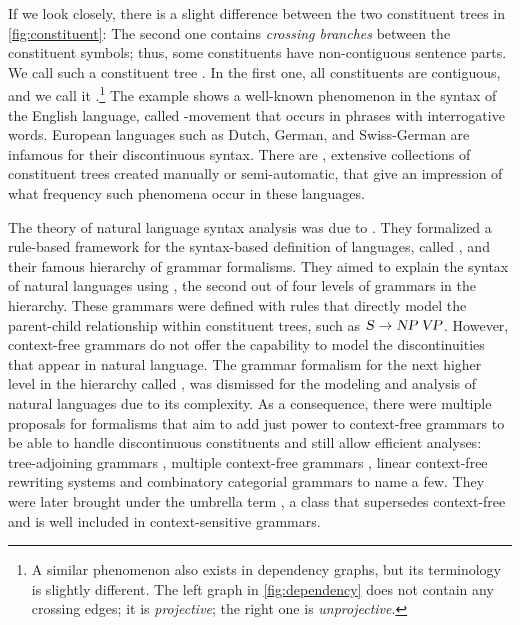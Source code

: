 \documentclass[../document.tex]{subfiles}
\begin{document}
    If we look closely, there is a slight difference between the two constituent trees in \cref{fig:constituent}:
        The second one contains \emph{crossing branches} between the constituent symbols; thus, some constituents have non-contiguous sentence parts.
    We call such a constituent tree .
    In the first one, all constituents are contiguous, and we call it .\footnote{
        A similar phenomenon also exists in dependency graphs, but its terminology is slightly different.
        The left graph in \cref{fig:dependency} does not contain any crossing edges; it is \emph{projective}; the right one is \emph{unprojective}.
    }
    The example shows a well-known phenomenon in the syntax of the English language, called -movement that occurs in phrases with interrogative words.
    European languages such as Dutch, German, and Swiss-German are infamous for their discontinuous syntax. \citep{Shieber85,Becker91}
    There are , extensive collections of constituent trees created manually or semi-automatic, that give an impression of what frequency such phenomena occur in these languages. \citep{Marcus94,EvaKal11,Skut98,Brants04,Noo13}
    
    The theory of natural language syntax analysis was due to \citet{Cho56}.
    They formalized a rule-based framework for the syntax-based definition of languages, called , and their famous hierarchy of grammar formalisms.
    They aimed to explain the syntax of natural languages using , the second out of four levels of grammars in the hierarchy.
    These grammars were defined with rules that directly model the parent-child relationship within constituent trees, such as \(\textsc{\textsl{S}} \to \textsc{\textsl{NP}}\,\textsc{\textsl{VP}}\).
    However, context-free grammars do not offer the capability to model the discontinuities that appear in natural language. \citep{Shieber85}
    The grammar formalism for the next higher level in the hierarchy called , was dismissed for the modeling and analysis of natural languages due to its complexity.
    As a consequence, there were multiple proposals for formalisms that aim to add just power to context-free grammars to be able to handle discontinuous constituents and still allow efficient analyses:
        tree-adjoining grammars \citep{JosLevTak75}, multiple context-free grammars \citep{SekMatFujKas91}, linear context-free rewriting systems \citep{VijWeiJos87} and combinatory categorial grammars \citep{Ste11} to name a few.
    They were later brought under the umbrella term , a class that supersedes context-free and is well included in context-sensitive grammars.
    
\end{document}
